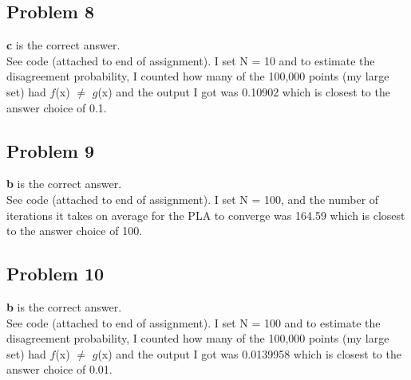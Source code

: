 \documentclass[12 pt]{article}
\begin{document}
	\subsection*{Problem 8}
	
	\textbf{c} is the correct answer.\\
	See code (attached to end of assignment). I set N = 10 and to estimate the disagreement probability, I counted how many of the 100,000 points (my large set) had $f$(x) $\neq$ $g$(x) and the output I got was 0.10902 which is closest to the answer choice of 0.1.
	
	\subsection*{Problem 9}
	
	\textbf{b} is the correct answer.\\
	See code (attached to end of assignment). I set N = 100, and the number of iterations it takes on average for the PLA to converge was 164.59 which is closest to the answer choice of 100.
	
	
	\subsection*{Problem 10}
	
	\textbf{b} is the correct answer.\\
	See code (attached to end of assignment). I set N = 100 and to estimate the disagreement probability, I counted how many of the 100,000 points (my large set) had $f$(x) $\neq$ $g$(x) and the output I got was 0.0139958 which is closest to the answer choice of 0.01.
	
	
\end{document}

